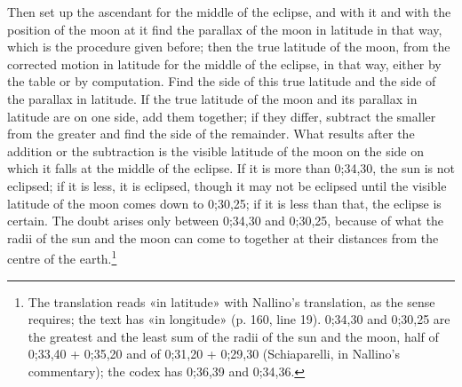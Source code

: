 \documentclass[11pt]{article}
\newcommand{\ArPage}[1]{\marginpar{\footnotesize\color{gray}Ar.\,p.\,#1}}
\begin{document}
\par \ArPage{161}Then set up the ascendant for the middle of the eclipse, and with it and with the position of the moon at it find the parallax of the moon in latitude in that way, which is the procedure given before; then the true latitude of the moon, from the corrected motion in latitude for the middle of the eclipse, in that way, either by the table or by computation. Find the side of this true latitude and the side of the parallax in latitude. If the true latitude of the moon and its parallax in latitude are on one side, add them together; if they differ, subtract the smaller from the greater and find the side of the remainder. What results after the addition or the subtraction is the visible latitude of the moon on the side on which it falls at the middle of the eclipse. If it is more than 0;34,30, the sun is not eclipsed; if it is less, it is eclipsed, though it may not be eclipsed until the visible latitude of the moon comes down to 0;30,25; if it is less than that, the eclipse is certain. The doubt arises only between 0;34,30 and 0;30,25, because of what the radii of the sun and the moon can come to together at their distances from the centre of the earth.\footnote{The translation reads «in latitude» with Nallino's translation, as the sense requires; the text has «in longitude» (p. 160, line 19). 0;34,30 and 0;30,25 are the greatest and the least sum of the radii of the sun and the moon, half of 0;33,40 + 0;35,20 and of 0;31,20 + 0;29,30 (Schiaparelli, in Nallino's commentary); the codex has 0;36,39 and 0;34,36.}\par
\end{document}

